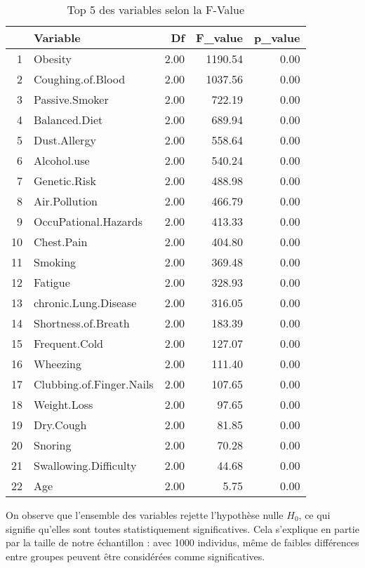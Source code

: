 \documentclass[a4paper,11pt]{article}
\begin{document}
\begin{center}
\begin{table}[ht]
\centering
\begin{tabular}{rlrrr}
  \hline
 & Variable & Df & F\_value & p\_value \\ 
  \hline
1 & Obesity & 2.00 & 1190.54 & 0.00 \\ 
  2 & Coughing.of.Blood & 2.00 & 1037.56 & 0.00 \\ 
  3 & Passive.Smoker & 2.00 & 722.19 & 0.00 \\ 
  4 & Balanced.Diet & 2.00 & 689.94 & 0.00 \\ 
  5 & Dust.Allergy & 2.00 & 558.64 & 0.00 \\ 
  6 & Alcohol.use & 2.00 & 540.24 & 0.00 \\ 
  7 & Genetic.Risk & 2.00 & 488.98 & 0.00 \\ 
  8 & Air.Pollution & 2.00 & 466.79 & 0.00 \\ 
  9 & OccuPational.Hazards & 2.00 & 413.33 & 0.00 \\ 
  10 & Chest.Pain & 2.00 & 404.80 & 0.00 \\ 
  11 & Smoking & 2.00 & 369.48 & 0.00 \\ 
  12 & Fatigue & 2.00 & 328.93 & 0.00 \\ 
  13 & chronic.Lung.Disease & 2.00 & 316.05 & 0.00 \\ 
  14 & Shortness.of.Breath & 2.00 & 183.39 & 0.00 \\ 
  15 & Frequent.Cold & 2.00 & 127.07 & 0.00 \\ 
  16 & Wheezing & 2.00 & 111.40 & 0.00 \\ 
  17 & Clubbing.of.Finger.Nails & 2.00 & 107.65 & 0.00 \\ 
  18 & Weight.Loss & 2.00 & 97.65 & 0.00 \\ 
  19 & Dry.Cough & 2.00 & 81.85 & 0.00 \\ 
  20 & Snoring & 2.00 & 70.28 & 0.00 \\ 
  21 & Swallowing.Difficulty & 2.00 & 44.68 & 0.00 \\ 
  22 & Age & 2.00 & 5.75 & 0.00 \\ 
   \hline
\end{tabular}
\caption{Top 5 des variables selon la F-Value} 
\end{table}\end{center}

On observe que l'ensemble des variables rejette l'hypothèse nulle \(H_0\), ce qui signifie qu'elles sont toutes statistiquement significatives. Cela s’explique en partie par la taille de notre échantillon : avec 1000 individus, même de faibles différences entre groupes peuvent être considérées comme significatives.
\end{document}
